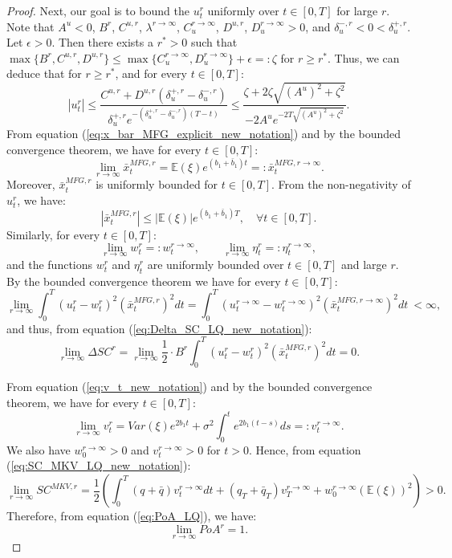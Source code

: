 \documentclass[11pt]{article}
\begin{document}
\begin{proof}
	Next, our goal is to bound the $u^r_t$ uniformly over $t \in [0,T]$ for large $r$.
	Note that  $A^u < 0$, $B^r$, $C^{u,r}$, $\lambda^{r\to \infty}$, $C^{r \to \infty}_u$, $D^{u,r}$, $D^{r \to \infty}_u> 0$, and $\delta^{-,r}_u < 0 < \delta^{+,r}_u$. Let $\epsilon>0$. Then there exists a $r^*>0$ such that $\max\{ B^{r}, C^{u,r}, D^{u,r} \} \leq \max\{C^{r \to \infty}_u,D^{r \to \infty}_u \}+\epsilon=: \zeta$ for $r \geq r^*$. Thus, we can deduce that for $r \geq r^*$, and for every $t \in [0,T]$:
	\begin{equation*}
	\left\vert u_t^{r} \right\vert \leq \frac{C^{u,r} + D^{u,r} (\delta^{+,r}_u - \delta^{-,r}_u)}{\delta^{+,r}_u e^{- (\delta^{+,r}_u - \delta^{-,r}_u)(T-t)}} 
	\leq  \frac{ \zeta + 2 \zeta \sqrt{(A^u)^2 + \zeta^2}  }{-2A^u e^{-2T \sqrt{(A^u)^2 + \zeta^2} } }.
	\end{equation*}
	From equation (\ref{eq:x_bar_MFG_explicit_new_notation}) and by the bounded convergence theorem, we have for every $t \in [0,T]$:
	\begin{equation*}
		\lim_{r\to \infty}\bar{x}_t^{MFG,r} = \mathbb{E}(\xi) e^{(b_1+ \bar{b}_1)t} =: \bar{x}_t^{MFG,r\to \infty}.
	\end{equation*}
	Moreover, $\bar{x}_t^{MFG,r}$ is uniformly bounded for $t \in [0,T]$. From the non-negativity of $u^r_t$, we have:
	$$ \left\vert \bar{x}^{MFG,r}_t \right\vert \leq \vert \mathbb{E}(\xi) \vert e^{ (b_1 + \bar{b}_1 ) T }, \quad \forall t \in [0,T]. $$  	
	Similarly, for every $t\in [0,T]$:
	$$\lim_{r\to \infty}w^r_t =: w_t^{r\to \infty},\qquad \lim_{r\to \infty} \eta^r_t =: \eta_t^{r\to \infty},$$
	and the functions $w^{r}_t$ and $\eta^{r}_t$ are uniformly bounded over $t \in[0,T]$ and large $r$. By the bounded convergence theorem we have for every $t \in [0,T]$:
	\begin{equation*}
	\lim_{r \to \infty} \int_0^T (u^r_t - w^r_t)^2 (\bar{x}_t^{MFG,r})^2 dt = \int_0^T (u^{r \to \infty}_t- w^{r \to \infty}_t)^2 (\bar{x}_t^{MFG,r\to \infty})^2 dt \  < \infty,
	\end{equation*}
	and thus, from equation (\ref{eq:Delta_SC_LQ_new_notation}):
	\begin{equation*}
	\lim_{r \to \infty} \Delta SC^r = \lim_{r \to \infty} \frac{1}{2}\cdot B^r\int_0^T (u^r_t - w^r_t)^2 ( \bar{x}_t^{MFG,r})^2 dt = 0.
	\end{equation*}
	
	From equation (\ref{eq:v_t_new_notation}) and by the bounded convergence theorem, we have for every $t \in [0,T]$: 
	$$	\lim_{r\to \infty} v^r_t = Var(\xi)e^{2b_1 t} + \sigma^2 \int_0^t e^{2 b_1 (t-s) } ds =: v^{r \to \infty}_t.
	$$
	We also have $w^{r \to \infty }_0 >0$ and $v^{r \to \infty}_t >0$ for $t>0$. Hence, from equation (\ref{eq:SC_MKV_LQ_new_notation}):
	\begin{equation*}
		\lim_{r \to \infty} SC^{MKV,r} = \frac{1}{2} \left( \int_0^T (q+\bar{q}) v^{r \to \infty}_t dt + (q_T + \bar{q}_T) v^{r\to \infty}_T + w^{r \to \infty}_0 (\mathbb{E}(\xi))^2 \right)  >0.
	\end{equation*}
	Therefore, from equation (\ref{eq:PoA_LQ}), we have: 
	$$\displaystyle \lim_{r \to \infty} PoA^r = 1.$$
	

\end{proof}
\end{document}
